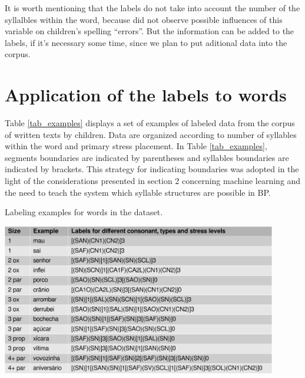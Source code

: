 It is worth mentioning that the labels do not take into account the number of the syllalbles within the word, because \citet{Chacon2018} did not observe possible influences of this variable on children's spelling ``errors''. But the information can be added to the labels, if it's necessary some time, since we plan to put aditional data into the corpus.

\section{Application of the labels to words}
Table \ref{tab_examples} displays a set of examples of labeled data from the corpus of written texts by children. Data are organized according to number of syllables within the word and primary stress placement. In Table \ref{tab_examples}, segments boundaries are indicated by parentheses and syllables boundaries are indicated by brackets. This strategy for indicating boundaries was adopted in the light of the considerations presented in section 2 concerning machine learning and the need to teach the system which syllable structures are possible in BP.

\begin{table}[!ht]
\caption{Labeling examples for words in the dataset.}
\label{tab_examples}
\centering
\includegraphics[width=0.9\textwidth]{imgs/adelaideherci14-examples.pdf}
\end{table}

